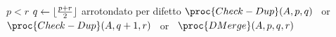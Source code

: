 \begin{codebox}
\li \If $p < r$
\li     \Then
            $q \gets \lfloor\frac{p + r}{2}\rfloor$ 
        \Comment arrotondato per difetto
\li         \Return $\proc{Check-Dup}(A,p,q)$
\li         \mbox{ or } $\proc{Check-Dup}(A,q+1,r)$
\li         \mbox{ or } $\proc{DMerge}(A,p,q,r)$
        \End
\end{codebox}